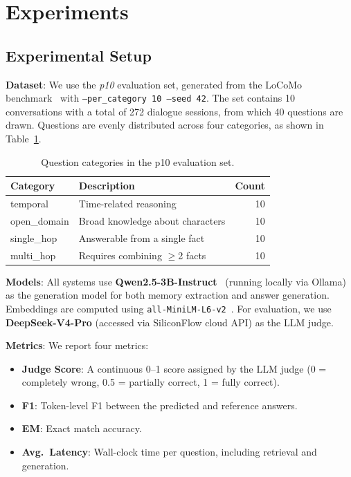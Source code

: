 \documentclass[11pt]{article}
\begin{document}
\section{Experiments}

\subsection{Experimental Setup}

\textbf{Dataset}: We use the \textit{p10} evaluation set, generated from the LoCoMo benchmark~\cite{maharana2024locomo} with \texttt{--per\_category 10 --seed 42}. The set contains 10 conversations with a total of 272 dialogue sessions, from which 40 questions are drawn. Questions are evenly distributed across four categories, as shown in Table~\ref{tab:categories}.

\begin{table}[t]
\centering
\small
\begin{tabular}{llr}
\toprule
\textbf{Category} & \textbf{Description} & \textbf{Count} \\
\midrule
temporal    & Time-related reasoning & 10 \\
open\_domain & Broad knowledge about characters & 10 \\
single\_hop & Answerable from a single fact & 10 \\
multi\_hop  & Requires combining $\geq$2 facts & 10 \\
\bottomrule
\end{tabular}
\caption{Question categories in the p10 evaluation set.}
\label{tab:categories}
\end{table}

\textbf{Models}: All systems use \textbf{Qwen2.5-3B-Instruct}~\cite{qwen2024} (running locally via Ollama) as the generation model for both memory extraction and answer generation. Embeddings are computed using \texttt{all-MiniLM-L6-v2}~\cite{reimers2019sbert}. For evaluation, we use \textbf{DeepSeek-V4-Pro} (accessed via SiliconFlow cloud API) as the LLM judge.

\textbf{Metrics}: We report four metrics:
\begin{itemize}
    \item \textbf{Judge Score}: A continuous 0--1 score assigned by the LLM judge (0 = completely wrong, 0.5 = partially correct, 1 = fully correct).
    \item \textbf{F1}: Token-level F1 between the predicted and reference answers.
    \item \textbf{EM}: Exact match accuracy.
    \item \textbf{Avg.\ Latency}: Wall-clock time per question, including retrieval and generation.
\end{itemize}
\end{document}
